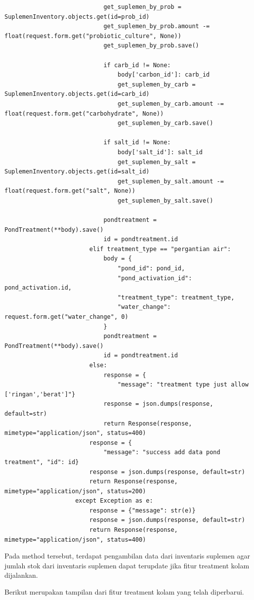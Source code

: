 \begin{spacing}{1.5}
\begin{enumerate}
\begin{lstlisting}
							get_suplemen_by_prob = SuplemenInventory.objects.get(id=prob_id)
							get_suplemen_by_prob.amount -= float(request.form.get("probiotic_culture", None))
							get_suplemen_by_prob.save()

							if carb_id != None:
								body['carbon_id']: carb_id
								get_suplemen_by_carb = SuplemenInventory.objects.get(id=carb_id)
								get_suplemen_by_carb.amount -= float(request.form.get("carbohydrate", None))
								get_suplemen_by_carb.save()

							if salt_id != None:
								body['salt_id']: salt_id
								get_suplemen_by_salt = SuplemenInventory.objects.get(id=salt_id)
								get_suplemen_by_salt.amount -= float(request.form.get("salt", None))
								get_suplemen_by_salt.save()

							pondtreatment = PondTreatment(**body).save()
							id = pondtreatment.id
						elif treatment_type == "pergantian air":
							body = {
								"pond_id": pond_id,
								"pond_activation_id": pond_activation.id,
								"treatment_type": treatment_type,
								"water_change": request.form.get("water_change", 0)
							}
							pondtreatment = PondTreatment(**body).save()
							id = pondtreatment.id
						else:
							response = {
								"message": "treatment type just allow ['ringan','berat']"}
							response = json.dumps(response, default=str)
							return Response(response, mimetype="application/json", status=400)
						response = {
							"message": "success add data pond treatment", "id": id}
						response = json.dumps(response, default=str)
						return Response(response, mimetype="application/json", status=200)
					except Exception as e:
						response = {"message": str(e)}
						response = json.dumps(response, default=str)
						return Response(response, mimetype="application/json", status=400)
		\end{lstlisting}

		Pada method tersebut, terdapat pengambilan data dari inventaris suplemen agar jumlah stok dari inventaris suplemen dapat terupdate jika fitur treatment kolam dijalankan.

		Berikut merupakan tampilan dari fitur treatment kolam yang telah diperbarui.


\end{enumerate}
\end{spacing}
